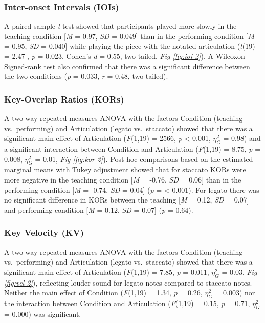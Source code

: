 \documentclass[
  man,floatsintext]{apa6}
\begin{document}
\hypertarget{inter-onset-intervals-iois-2}{%
\subsubsection{Inter-onset Intervals (IOIs)}\label{inter-onset-intervals-iois-2}}

A paired-sample \emph{t}-test showed that participants played more slowly in the teaching condition {[}\emph{M} = 0.97, \emph{SD} = 0.049{]} than in the performing condition {[}\emph{M} = 0.95, \emph{SD} = 0.040{]} while playing the piece with the notated articulation (\emph{t}(19) = 2.47
, \emph{p} = 0.023, Cohen's \emph{d} = 0.55, two-tailed, \emph{Fig \ref{fig:ioi-2}}). A Wilcoxon Signed-rank test also confirmed that there was a significant difference between the two conditions (\emph{p} = 0.033, \emph{r} = 0.48, two-tailed).

\hypertarget{key-overlap-ratios-kors}{%
\subsubsection{Key-Overlap Ratios (KORs)}\label{key-overlap-ratios-kors}}

A two-way repeated-measures ANOVA with the factors Condition (teaching vs.~performing) and Articulation (legato vs.~staccato) showed that there was a significant main effect of Articulation (\emph{F}(1,19) = 2566, \emph{p} \textless{} 0.001, \(\eta_G^2\) = 0.98) and a significant interaction between Condition and Articulation (\emph{F}(1,19) = 8.75, \emph{p} = 0.008, \(\eta_G^2\) = 0.01, \emph{Fig \ref{fig:kor-2}}). Post-hoc comparisons based on the estimated marginal means with Tukey adjustment showed that for staccato KORs were more negative in the teaching condition {[}\emph{M} = -0.76, \emph{SD} = 0.06{]} than in the performing condition {[}\emph{M} = -0.74, \emph{SD} = 0.04{]} (\emph{p} = \textless{} 0.001). For legato there was no significant difference in KORs between the teaching {[}\emph{M} = 0.12, \emph{SD} = 0.07{]} and performing condition {[}\emph{M} = 0.12, \emph{SD} = 0.07{]} (\emph{p} = 0.64).

\hypertarget{key-velocity-kv-2}{%
\subsubsection{Key Velocity (KV)}\label{key-velocity-kv-2}}

A two-way repeated-measures ANOVA with the factors Condition (teaching vs.~performing) and Articulation (legato vs.~staccato) showed that there was a significant main effect of Articulation (\emph{F}(1,19) = 7.85, \emph{p} = 0.011, \(\eta_G^2\) = 0.03, \emph{Fig \ref{fig:vel-2}}), reflecting louder sound for legato notes compared to staccato notes. Neither the main effect of Condition (\emph{F}(1,19) = 1.34, \emph{p} = 0.26, \(\eta_G^2\) = 0.003) nor the interaction between Condition and Articulation (\emph{F}(1,19) = 0.15, \emph{p} = 0.71, \(\eta_G^2\) = 0.000) was significant.
\end{document}
